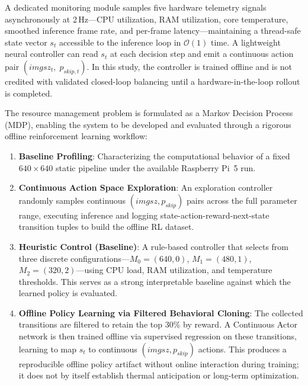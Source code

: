 \documentclass{ieeeaccess}
\begin{document}
\begin{highlight}
A dedicated monitoring module samples five hardware telemetry signals asynchronously at 2\,Hz—CPU utilization, RAM utilization, core temperature, smoothed inference frame rate, and per-frame latency—maintaining a thread-safe state vector $s_t$ accessible to the inference loop in $\mathcal{O}(1)$ time. A lightweight neural controller can read $s_t$ at each decision step and emit a continuous action pair $(imgsz_t,\; p_{skip,t})$. In this study, the controller is trained offline and is not credited with validated closed-loop balancing until a hardware-in-the-loop rollout is completed.
\end{highlight}

The resource management problem is formulated as a Markov Decision Process (MDP), enabling the system to be developed and evaluated through a rigorous offline reinforcement learning workflow:
\begin{enumerate}
    \item \textbf{Baseline Profiling}: Characterizing the computational behavior of a fixed $640 \times 640$ static pipeline under the available Raspberry Pi~5 run.
    \item \textbf{Continuous Action Space Exploration}: An exploration controller randomly samples continuous $(imgsz, p_{skip})$ pairs across the full parameter range, executing inference and logging state-action-reward-next-state transition tuples to build the offline RL dataset.
    \item \textbf{Heuristic Control (Baseline)}: A rule-based controller that selects from three discrete configurations—$M_0\!=\!(640,0)$, $M_1\!=\!(480,1)$, $M_2\!=\!(320,2)$—using CPU load, RAM utilization, and temperature thresholds. This serves as a strong interpretable baseline against which the learned policy is evaluated.
    \item \textbf{Offline Policy Learning via Filtered Behavioral Cloning}: The collected transitions are filtered to retain the top 30\% by reward. A Continuous Actor network is then trained offline via supervised regression on these transitions, learning to map $s_t$ to continuous $(imgsz, p_{skip})$ actions. This produces a reproducible offline policy artifact without online interaction during training; it does not by itself establish thermal anticipation or long-term optimization.
\end{enumerate}
\end{document}
